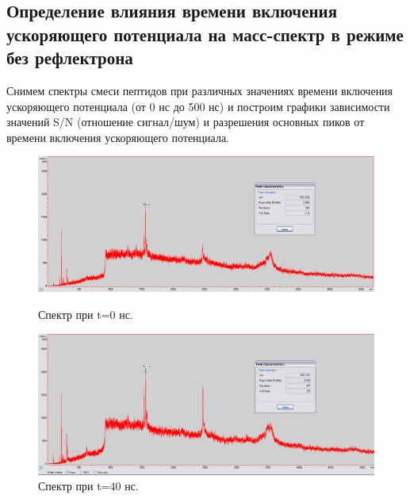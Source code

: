 \documentclass[12pt]{article}
\begin{document}
\begin{flushleft}
\subsection{Определение влияния времени включения ускоряющего потенциала на масс-спектр в режиме без рефлектрона}
Снимем спектры смеси пептидов при различных значениях времени включения ускоряющего потенциала (от 0 нс до 500 нс) и построим графики зависимости значений S/N (отношение сигнал/шум) и разрешения
основных пиков от времени включения ускоряющего потенциала.
\begin{figure}[!h]
\begin{center}
\begin{minipage}[h]{0.4\linewidth}
\includegraphics[width=1.2\linewidth]{11}
\caption{Спектр при t=0 нс.} %
\label{ris:experimoriginal} %
\end{minipage}
\hfill 
\begin{minipage}[h]{0.4\linewidth}
\includegraphics[width=1.2\linewidth]{12}
\caption{Спектр при t=40 нс.}
\label{ris:experimcoded}
\end{minipage}
\end{center}
\end{figure}


\end{flushleft}
\end{document}
